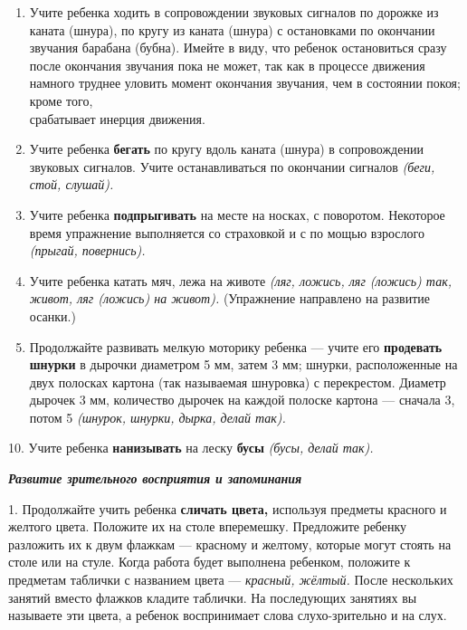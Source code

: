 \documentclass{book}
\renewcommand{\emph}[1]{\textit{#1}}
\begin{document}
\begin{enumerate}
\def\labelenumi{\arabic{enumi}.}
\setcounter{enumi}{4}
\item
  
  Учите ребенка ходить в сопровождении звуковых сигналов по дорожке из
  каната (шнура), по кругу из каната (шнура) с остановками по окончании
  звучания барабана (бубна). Имейте в виду, что ребенок остановиться
  сразу после окончания звучания пока не может, так как в процессе
  движения намного труднее уловить момент окончания звучания, чем в
  состоянии покоя; кроме того,\\
  срабатывает инерция движения.
  
\item
  
  Учите ребенка \textbf{бегать} по кругу вдоль каната (шнура) в
  сопровождении звуковых сигналов. Учите останавливаться по окончании
  сигналов \emph{(беги, стой, слушай).}
  
\item
  
  Учите ребенка \textbf{подпрыгивать} на месте на носках, с поворотом.
  Некоторое время упражнение выполняется со страховкой и с по мощью
  взрослого \emph{(прыгай, повернись).}
  
\item
  
  Учите ребенка катать мяч, лежа на животе \emph{(ляг, ложись, ляг
  (ложись) так, живот, ляг (ложись) на живот).} (Упражнение направлено
  на развитие осанки.)
  
\item
  
  Продолжайте развивать мелкую моторику ребенка --- учите его
  \textbf{продевать шнурки} в дырочки диаметром 5 мм, затем 3 мм;
  шнурки, расположенные на двух полосках картона (так называемая
  шнуровка) с перекрестом. Диаметр дырочек 3 мм, количество дырочек на
  каждой полоске картона --- сначала 3, потом 5 \emph{(шнурок, шнурки,
  дырка, делай так).}
  
\end{enumerate}


10. Учите ребенка \textbf{нанизывать} на леску \textbf{бусы}
\emph{(бусы, делай так).}

\emph{\textbf{Развитие зрительного восприятия и запоминания}}

1. Продолжайте учить ребенка \textbf{сличать цвета,} используя предметы
красного и желтого цвета. Положите их на столе вперемешку. Предложите
ребенку разложить их к двум флажкам --- красному и желтому, которые
могут стоять на столе или на стуле. Когда работа будет выполнена
ребенком, положите к предметам таблички с названием цвета ---
\emph{красный, жёлтый.} После нескольких занятий вместо флажков кладите
таблички. На последующих занятиях вы называете эти цвета, а ребенок
воспринимает слова слухо-зрительно и на слух.
\end{document}
